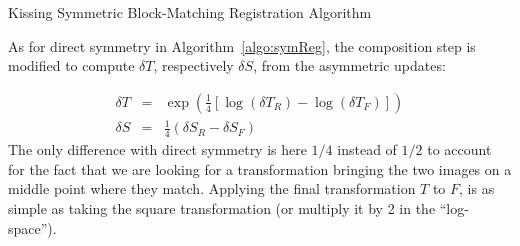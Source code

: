 \documentclass[a4paper]{article}
\begin{document}
\begin{algorithm}[!htbp]
\caption{Kissing Symmetric Block-Matching Registration Algorithm}
\label{algo:kSymReg}
\begin{algorithmic}[1]
    \ENDFOR
  \ENDFOR
\end{algorithmic}
\end{algorithm}
As for direct symmetry in Algorithm~\ref{algo:symReg}, the composition step is modified to compute $\delta T$, respectively $\delta S$, from the asymmetric updates:

\begin{eqnarray}
	\delta T & = & \exp\left(\frac{1}{4} \left[\log(\delta T_R) - \log(\delta T_F)\right] \right) \\
	\delta S & = & \frac{1}{4} \left(\delta S_R - \delta S_F\right)
\end{eqnarray}
The only difference with direct symmetry is here $1/4$ instead of $1/2$ to account for the fact that we are looking for a transformation bringing the two images on a middle point where they match. Applying the final transformation $T$ to $F$, is as simple as taking the square transformation (or multiply it by 2 in the ``log-space'').

\newpage 



\end{document}
